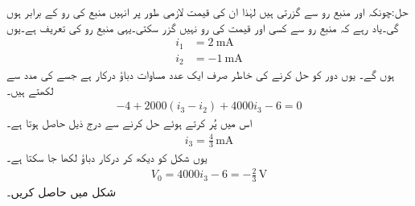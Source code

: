 حل:چونکہ  اور  منبع رو سے گزرتی ہیں لہٰذا ان کی قیمت لازمی طور پر انہیں منبع کی رو کے برابر ہوں گی۔یاد رہے کہ منبع رو سے کسی اور قیمت کی رو نہیں گزر سکتی۔یہی منبع رو کی تعریف ہے۔یوں
\begin{align*}
i_1&=\SI{2}{\milli\ampere}\\
i_2&=\SI{-1}{\milli\ampere}
\end{align*}
ہوں گے۔ یوں دور کو حل کرنے کی خاطر صرف ایک عدد مساوات دباؤ درکار ہے جسے  کی مدد سے لکھتے ہیں۔
\begin{align*}
-4 +2000(i_3-i_2)+4000i_3-6=0
\end{align*} 
اس میں  پُر کرتے ہوئے حل کرنے سے درج ذیل حاصل ہوتا ہے۔
\begin{align*}
i_3=\frac{4}{3}\, \si{\milli\ampere}
\end{align*}
یوں شکل کو دیکھ کر درکار دباؤ لکھا جا سکتا ہے۔
\begin{align*}
V_0=4000i_3-6=-\frac{2}{3}\, \si{\volt}
\end{align*}
شکل  میں  حاصل کریں۔
